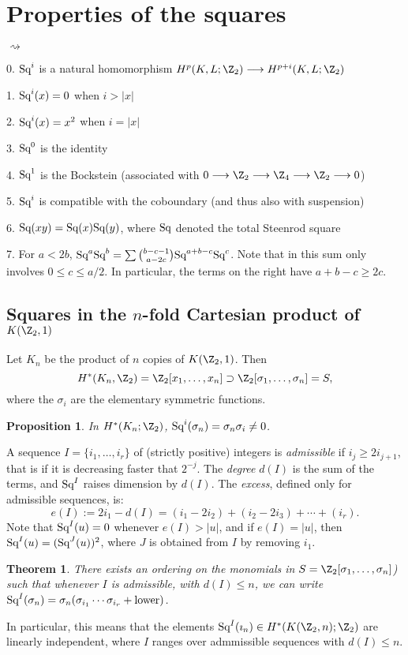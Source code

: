 \documentclass[11pt]{article}
\newcommand{\Squ}{\textup{Sq}}
\theoremstyle{plain}
\newtheorem*{thm*}{Theorem}
\newtheorem*{prop*}{Proposition}
\theoremstyle{definition}
\renewcommand{\to}{\longrightarrow}
\newenvironment{itemise}{
\begin{list}{\textup{$\rightsquigarrow$}}
   {
      \setlength{\topsep}{.1cm}
      \setlength{\itemsep}{1pt}
      \setlength{\parskip}{0pt}
      \setlength{\parsep}{0pt}
   }
}{\end{list}\vspace{-.2cm}}
\begin{document}
\section{Properties of the squares}
\begin{itemise}
\item[0.] $\Squ^i$ is a natural homomorphism $H^p(K,L;\Z_2)\to H^{p+i}(K,L;\Z_2)$
\item[1.] $\Squ^i(x)=0$ when $i>|x|$
\item[2.] $\Squ^i(x)=x^2$ when $i=|x|$
\item[3.] $\Squ^0$ is the identity
\item[4.] $\Squ^1$ is the Bockstein (associated with $0\to\Z_2\to\Z_4\to\Z_2\to0$)
\item[5.] $\Squ^i$ is compatible with the coboundary (and thus also with suspension)
\item[6.] $\Squ(xy)=\Squ(x)\Squ(y)$, where $\Squ$ denoted the total Steenrod square
\item[7.] For $a<2b$, $\Squ^a\Squ^b=\sum{b-c-1\choose a-2c}\Squ^{a+b-c}\Squ^c$. Note that in this sum only involves $0\leq c\leq a/2$. In particular, the terms on the right have $a+b-c\geq 2c$.
\end{itemise}
\setcounter{subsection}{2}
\subsection{Squares in the \texorpdfstring{$n$-fold}{n-fold} Cartesian product of \texorpdfstring{$K(\Z_2,1)$}{K(Z/2,1)}}
Let $K_n$ be the product of $n$ copies of $K(\Z_2,1)$. Then 
\[H^*(K_n,\Z_2)=\Z_2[x_1,\ldots,x_n]\supset\Z_2[\sigma_1,\ldots,\sigma_n]=S,\]
where the $\sigma_i$ are the elementary symmetric functions.


\begin{prop*}
In $H^*(K_n;\Z_2)$, $\Squ^i(\sigma_n)=\sigma_n\sigma_i\neq0$.
\end{prop*}
A sequence $I=\{i_1,\ldots,i_r\}$ of (strictly positive) integers is \emph{admissible} if $i_j\geq 2i_{j+1}$, that is if it is decreasing faster that $2^{-j}$. The \emph{degree} $d(I)$ is the sum of the terms, and $\Squ^I$ raises dimension by $d(I)$. The \emph{excess}, defined only for admissible sequences, is:
\[e(I):=2i_1-d(I)=(i_1-2i_2)+(i_2-2i_3)+\cdots+(i_r).\]
Note that $\Squ^I(u)=0$ whenever $e(I)>|u|$, and if $e(I)=|u|$, then $\Squ^I(u)=(\Squ^J(u))^2$, where $J$ is obtained from $I$ by removing $i_1$.
\begin{thm*}
There exists an ordering on the monomials in $S=\Z_2[\sigma_1,\ldots,\sigma_n]$) such that whenever $I$ is admissible, with $d(I)\leq n$, we can write $\Squ^I(\sigma_n)=\sigma_n(\sigma_{i_1}\cdots\sigma_{i_r}+\textup{lower})$.
\end{thm*}
In particular, this means that the elements $\Squ^I(\imath_n)\in H^*(K(\Z_2,n);\Z_2)$ are linearly independent, where $I$ ranges over admmissible sequences with $d(I)\leq n$.
\end{document}
